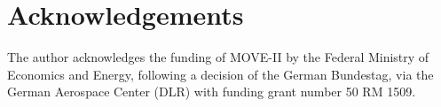 \cleardoublepage
\section*{Acknowledgements}

The author acknowledges the funding of MOVE-II by the Federal Ministry of Economics and Energy, following a decision of the German Bundestag, via the German Aerospace Center (DLR) with funding grant number 50 RM 1509.
